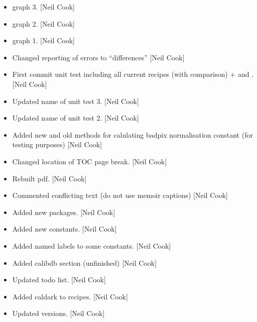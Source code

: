 \documentclass[a4paper,10pt,english]{report}
\begin{document}
\begin{itemize}
\item {} 
 graph 3. {[}Neil Cook{]}

\item {} 
 graph 2. {[}Neil Cook{]}

\item {} 
 graph 1. {[}Neil Cook{]}

\item {} 
Changed reporting of errors to “differences” {[}Neil Cook{]}

\item {} 
First commit unit test including all current recipes (with comparison)
+  and . {[}Neil Cook{]}

\item {} 
Updated name of unit test 3. {[}Neil Cook{]}

\item {} 
Updated name of unit test 2. {[}Neil Cook{]}

\item {} 
Added new and old methods for calulating badpix normalisation constant
(for testing purposes) {[}Neil Cook{]}

\item {} 
Changed location of TOC page break. {[}Neil Cook{]}

\item {} 
Rebuilt pdf. {[}Neil Cook{]}

\item {} 
Commented conflicting text (do not use memoir captions) {[}Neil Cook{]}

\item {} 
Added new packages. {[}Neil Cook{]}

\item {} 
Added new constants. {[}Neil Cook{]}

\item {} 
Added named labels to some constants. {[}Neil Cook{]}

\item {} 
Added calibdb section (unfinished) {[}Neil Cook{]}

\item {} 
Updated todo list. {[}Neil Cook{]}

\item {} 
Added caldark to recipes. {[}Neil Cook{]}

\item {} 
Updated versions. {[}Neil Cook{]}


\end{itemize}
\end{document}

